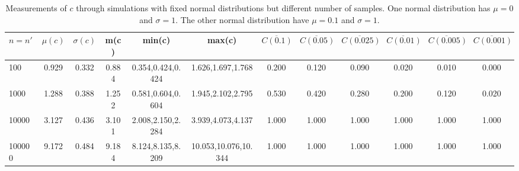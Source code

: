 \begin{table*}[h!]
\begin{center}
\begin{tabular}{| l | c | c | c | c | c | c | c | c | c | c | c |}\hline
$n=n'$ & $\mu(c)$ & $\sigma(c)$ & m(c) & min(c) & max(c) & $\overline{C(0.1)}$ & $\overline{C(0.05)}$ & $\overline{C(0.025)}$ & $\overline{C(0.01)}$ & $\overline{C(0.005)}$ & $\overline{C(0.001)}$ \\\hline
100 & 0.929 & 0.332 & 0.884 & 0.354,0.424,0.424 & 1.626,1.697,1.768  & 0.200  & 0.120  & 0.090  & 0.020  & 0.010  & 0.000 \\\hline
1000 & 1.288 & 0.388 & 1.252 & 0.581,0.604,0.604 & 1.945,2.102,2.795  & 0.530  & 0.420  & 0.280  & 0.200  & 0.120  & 0.020 \\\hline
10000 & 3.127 & 0.436 & 3.101 & 2.008,2.150,2.284 & 3.939,4.073,4.137  & 1.000  & 1.000  & 1.000  & 1.000  & 1.000  & 1.000 \\\hline
100000 & 9.172 & 0.484 & 9.184 & 8.124,8.135,8.209 & 10.053,10.076,10.344  & 1.000  & 1.000  & 1.000  & 1.000  & 1.000  & 1.000 \\\hline
\end{tabular}
\caption{Measurements of $c$ through simulations
        with fixed normal distributions but different number of samples.
        One normal distribution has $\mu=0$ and $\sigma=1$.
        The other normal distribution have $\mu=0.1$ and $\sigma=1$.}
\end{center}
\end{table*}